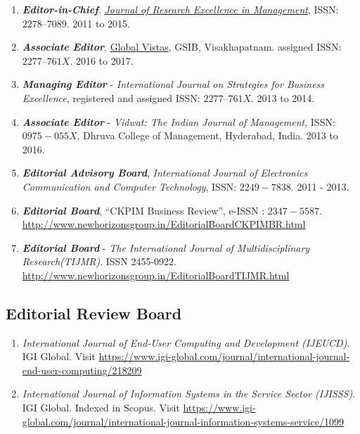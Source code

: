 \documentclass[10pt]{article}
\begin{document}
\begin{enumerate} \item \textit{\textbf{Editor-in-Chief}}. \href{http://sri-india.in/publications}\emph{ Journal of Research Excellence in Management}, ISSN: $2278 – 7089$. 2011 to 2015. 

\item \textit{\textbf{Associate Editor}}. \href{http://gsib.org/wp-content/uploads/2016/12/GV-July-2016-with-corrections-05th-Dec-16-ilovepdf-compressed.pdf}{Global Vistas}, GSIB, Visakhapatnam. 
assigned ISSN: $2277 – 761X$. 2016 to 2017.  

\item \textit{\textbf{Managing Editor}} - \emph{International  Journal  on  Strategies  for  Business  Excellence},  registered  and assigned ISSN: $2277 – 761X$. 2013 to 2014. 

\item \textit{\textbf{Associate Editor}} - \emph{Vidwat: The Indian Journal of Management}, ISSN: $0975-055X$, Dhruva College of Management, Hyderabad, India. 2013 to 2016. 

\item \emph{\textbf{Editorial Advisory Board}}, \emph{International Journal of Electronics Communication and Computer Technology}, ISSN: $2249-7838$. 2011 - 2013. 

\item \emph{\textbf{Editorial Board}}, \enquote{CKPIM Business Review}, e-ISSN : $2347-5587$. \url{http://www.newhorizonsgroup.in/EditorialBoardCKPIMBR.html}

\item \emph{\textbf{Editorial Board}} - \emph{The International Journal of Multidisciplinary Research(TIJMR)}. ISSN 2455-0922. \url{http://www.newhorizonsgroup.in/EditorialBoardTIJMR.html}

\end{enumerate}

\subsection{Editorial Review Board} 

\begin{enumerate}
\item \emph{International Journal of End-User Computing and Development (IJEUCD)}. IGI Global. Visit \url{https://www.igi-global.com/journal/international-journal-end-user-computing/218209}

\item \emph{International Journal of Information Systems in the Service Sector (IJISSS)}. IGI Global. Indexed in Scopus. Visit \url{https://www.igi-global.com/journal/international-journal-information-systems-service/1099}

\end{enumerate}
\end{document}
